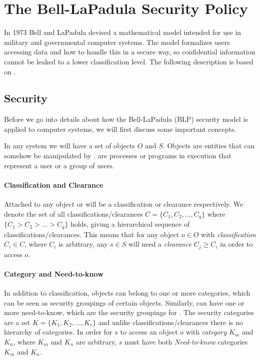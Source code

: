 \section{The Bell-LaPadula Security Policy}

In 1973 Bell and LaPadula devised a mathematical model intended for use in  military and governmental computer systems.
The model formalizes users accessing data and how to handle this in a secure way, so confidential information cannot be leaked to a lower classification level.
The following description is based on \citet{lapadula1996secure}.

\subsection{Security}
Before we go into details about how the Bell-LaPadula (BLP) security model is applied to computer systems, we will first discuss some important concepts.

In any system we will have a set of objects $O$ and \subjects{} $S$.
Objects are entities that can somehow be manipulated by \subjects{}.
\Subjects{} are processes or programs in execution that represent a user or a group of users.

\paragraph{Classification and Clearance}
Attached to any object or \ssubject{} will be a classification or clearance respectively.
We denote the set of all classifications/clearances $C = \{C_1, C_2,\dots,C_q\}$ where $\{C_1 > C_2 > \dots > C_q\}$ holds, giving a hierarchical sequence of classifications/clearances.
This means that for any object $o \in O$ with \textit{classification} $C_i \in C$, where $C_i$ is arbitrary, any \ssubject{} $s \in S$ will need a \textit{clearance} $C_j \geq C_i$ in order to access $o$.

\paragraph{Category and Need-to-know}
In addition to classification, objects can belong to one or more categories, which can be seen as security groupings of certain objects.
Similarly, \subjects{} can have one or more need-to-know, which are the security groupings for \subjects{}.
The security categories are a set $K = \{K_1, K_2, \dots, K_r\}$ and unlike classifications/clearances there is no hierarchy of categories.
In order for \ssubject{} $s$ to access an object $o$ with \textit{category} $K_m$ and $K_n$, where $K_m$ and $K_n$ are arbitrary, $s$ must have both \textit{Need-to-know} categories $K_m$ and $K_n$.

